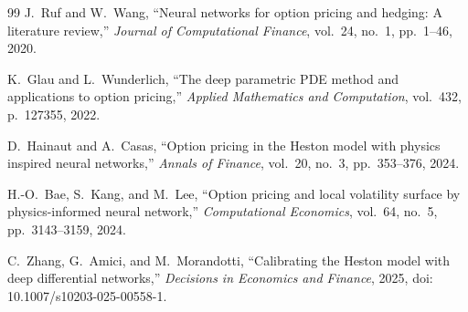 \documentclass[conference]{IEEEtran}
\begin{document}
\begin{thebibliography}{99}
 J.~Ruf and W.~Wang, ``Neural networks for option pricing and hedging: A literature review,'' \emph{Journal of Computational Finance}, vol.~24, no.~1, pp.~1--46, 2020.

 K.~Glau and L.~Wunderlich, ``The deep parametric PDE method and applications to option pricing,'' \emph{Applied Mathematics and Computation}, vol.~432, p.~127355, 2022.

 D.~Hainaut and A.~Casas, ``Option pricing in the Heston model with physics inspired neural networks,'' \emph{Annals of Finance}, vol.~20, no.~3, pp.~353--376, 2024.

 H.-O.~Bae, S.~Kang, and M.~Lee, ``Option pricing and local volatility surface by physics-informed neural network,'' \emph{Computational Economics}, vol.~64, no.~5, pp.~3143--3159, 2024.

 C.~Zhang, G.~Amici, and M.~Morandotti, ``Calibrating the Heston model with deep differential networks,'' \emph{Decisions in Economics and Finance}, 2025, doi: 10.1007/s10203-025-00558-1.

\end{thebibliography}
\end{document}

